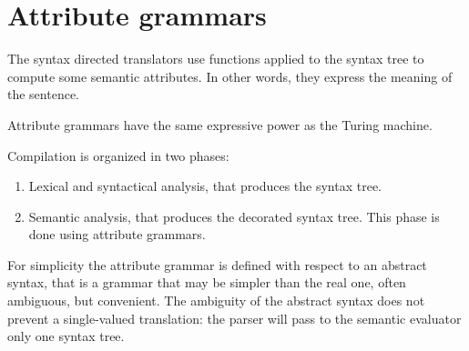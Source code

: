 \section{Attribute grammars}

The syntax directed translators use functions applied to the syntax tree to compute some semantic attributes.
In other words, they express the meaning of the sentence. 

Attribute grammars have the same expressive power as the Turing machine. 

Compilation is organized in two phases: 
\begin{enumerate}
    \item Lexical and syntactical analysis, that produces the syntax tree. 
    \item Semantic analysis, that produces the decorated syntax tree. 
        This phase is done using attribute grammars. 
\end{enumerate}

For simplicity the attribute grammar is defined with respect to an abstract syntax, that is a grammar that may be simpler than the real one, often ambiguous, but convenient. 
The ambiguity of the abstract syntax does not prevent a single-valued translation: the parser will pass to the semantic evaluator only one syntax tree. 

